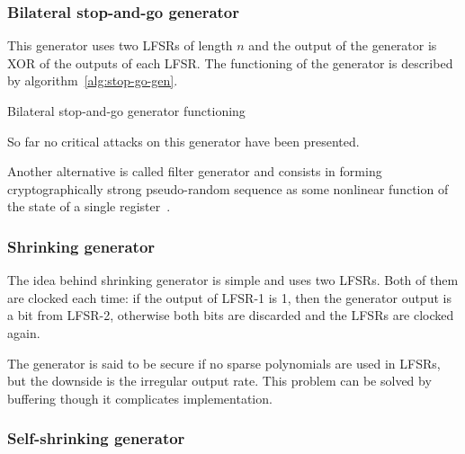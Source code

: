 \subsubsection{Bilateral stop-and-go generator}

This generator uses two LFSRs of length $n$ and the output of the generator is
XOR of the outputs of each LFSR. The functioning of the generator is described
by algorithm~\ref{alg:stop-go-gen}.

\begin{algorithm}
    \caption{Bilateral stop-and-go generator functioning}
    \label{alg:stop-go-gen}
    \DontPrintSemicolon

    \;
    \;
\end{algorithm}

So far no critical attacks on this generator have been presented.

Another alternative is called filter generator and consists in
forming cryptographically strong pseudo-random sequence as some nonlinear
function of the state of a single register~\cite{robshaw:rsa:streamciphers}.

\subsubsection{Shrinking generator}

The idea behind shrinking generator is simple and uses two LFSRs. Both of them
are clocked each time: if the output of LFSR-1 is 1, then the generator output
is a bit from LFSR-2, otherwise both bits are discarded and the LFSRs are
clocked again.

The generator is said to be secure if no sparse polynomials are used in LFSRs,
but the downside is the irregular output rate. This problem can be solved by
buffering though it complicates implementation. 

\subsubsection{Self-shrinking generator}

